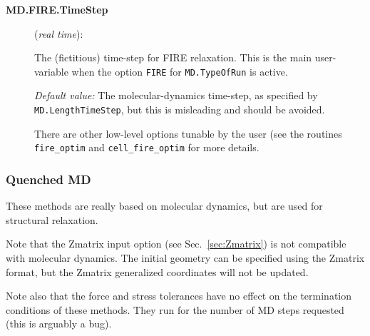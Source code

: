 \begin{description}
\item[\textbf{MD.FIRE.TimeStep}] (\textit{real time}):

The (fictitious) time-step for FIRE relaxation.
This is the main user-variable
when the option \texttt{FIRE} for \texttt{MD.TypeOfRun} is active.

\textit{Default value:} The molecular-dynamics time-step, as
specified by \texttt{MD.LengthTimeStep}, but this is misleading and
should be avoided.

There are other low-level options tunable by the user (see the
routines \texttt{fire\_optim} and \texttt{cell\_fire\_optim} for more details.

\end{description}

\subsubsection{Quenched MD}

These methods are really based on molecular dynamics, but are used for
structural relaxation.

Note that the Zmatrix input option (see
Sec.~\ref{sec:Zmatrix}) is not compatible with molecular dynamics. The
initial geometry can be specified using the Zmatrix format, but the
Zmatrix generalized coordinates will not be updated.

Note also that the force and stress tolerances have no effect on
the termination conditions of these methods. They run for the number
of MD steps requested (this is arguably a bug).

